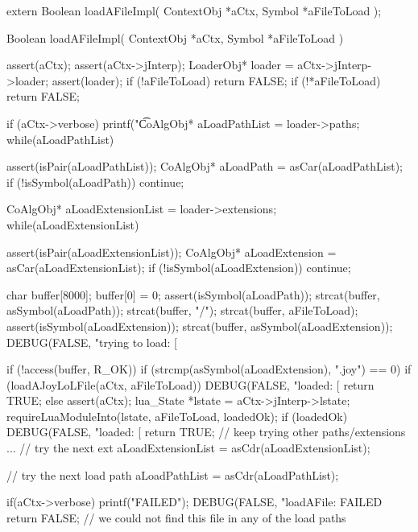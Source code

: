 \startCHeader
extern Boolean loadAFileImpl(
  ContextObj *aCtx,
  Symbol     *aFileToLoad
);
\stopCHeader
{}

\startCCode
Boolean loadAFileImpl(
  ContextObj *aCtx,
  Symbol     *aFileToLoad
) {
  assert(aCtx);
  assert(aCtx->jInterp);
  LoaderObj* loader = aCtx->jInterp->loader;
  assert(loader);
  if (!aFileToLoad) return FALSE;
  if (!*aFileToLoad) return FALSE;

  if (aCtx->verbose) printf("\t%

  CoAlgObj* aLoadPathList = loader->paths;
  while(aLoadPathList) {
    assert(isPair(aLoadPathList));
    CoAlgObj* aLoadPath = asCar(aLoadPathList);
    if (!isSymbol(aLoadPath)) continue;

    CoAlgObj* aLoadExtensionList = loader->extensions;
    while(aLoadExtensionList) {
      assert(isPair(aLoadExtensionList));
      CoAlgObj* aLoadExtension = asCar(aLoadExtensionList);
      if (!isSymbol(aLoadExtension)) continue;

      char buffer[8000];
      buffer[0] = 0;
      assert(isSymbol(aLoadPath));
      strcat(buffer, asSymbol(aLoadPath));
      strcat(buffer, "/");
      strcat(buffer, aFileToLoad);
      assert(isSymbol(aLoadExtension));
      strcat(buffer, asSymbol(aLoadExtension));
      DEBUG(FALSE, "trying to load: [%

      if (!access(buffer, R_OK)) {
        if (strcmp(asSymbol(aLoadExtension), ".joy") == 0) {
          if (loadAJoyLoLFile(aCtx, aFileToLoad)) {
            DEBUG(FALSE, "loaded: [%
            return TRUE;
          }
        } else {
          assert(aCtx);
          lua_State *lstate = aCtx->jInterp->lstate;
          requireLuaModuleInto(lstate, aFileToLoad, loadedOk);
          if (loadedOk) {
            DEBUG(FALSE, "loaded: [%
            return TRUE;
          }
        }
        // keep trying other paths/extensions ...
      }
      // try the next ext
      aLoadExtensionList = asCdr(aLoadExtensionList);
    }
    // try the next load path
    aLoadPathList = asCdr(aLoadPathList);
  }
  if(aCtx->verbose) printf("FAILED\n");
  DEBUG(FALSE, "loadAFile: FAILED%
  return FALSE; // we could not find this file in any of the load paths
}
\stopCCode

